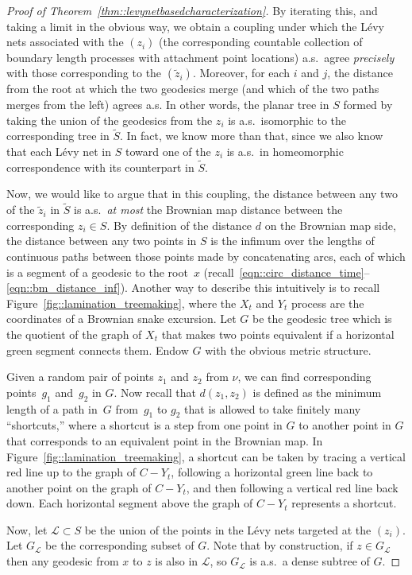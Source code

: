 \documentclass[JEP,XML,SOM,Unicode]{cedram}
\let\mathcal\mathscr
\theoremstyle{plain}
\numberwithin{theorem}{section}
\theoremstyle{definition}
\newcommand{\CL}{{\mathcal L}}
\let\wt\widetilde
\begin{document}
\begin{proof}[Proof of Theorem~\ref{thm::levynetbasedcharacterization}]
By iterating this, and taking a limit in the obvious way, we obtain a coupling under which the Lévy nets associated with the $(z_i)$ (\ie the corresponding countable collection of boundary length processes with attachment point locations) a.s.\ agree \emph{precisely} with those corresponding to the $(\wt{z}_i)$. Moreover, for each $i$ and $j$, the distance from the root at which the two geodesics merge (and which of the two paths merges from the left) agrees a.s. In other words, the planar tree in $S$ formed by taking the union of the geodesics from the $z_i$ is a.s.\ isomorphic to the corresponding tree in $\wt{S}$. In fact, we know more than that, since we also know that each Lévy net in $S$ toward one of the $z_i$ is a.s.\ in homeomorphic correspondence with its counterpart in $\wt{S}$.

Now, we would like to argue that in this coupling, the distance between any two of the $\wt{z}_i$ in $\wt{S}$ is a.s.\ \emph{at most} the Brownian map distance between the corresponding $z_i \in S$. By definition of the distance $d$ on the Brownian map side, the distance between any two points in $S$ is the infimum over the lengths of continuous paths between those points made by concatenating arcs, each of which is a segment of a geodesic to the root~$x$ (recall~\eqref{eqn::circ_distance_time}--\eqref{eqn::bm_distance_inf}). Another way to describe this intuitively is to recall Figure~\ref{fig::lamination_treemaking}, where the $X_t$ and $Y_t$ process are the coordinates of a Brownian snake excursion. Let $G$ be the geodesic tree which is the quotient of the graph of $X_t$ that makes two points equivalent if a horizontal green segment connects them. Endow $G$ with the obvious metric structure.

Given a random pair of points $z_1$ and $z_2$ from $\nu$, we can find corresponding points~$g_1$ and~$g_2$ in $G$. Now recall that $d(z_1, z_2)$ is defined as the minimum length of a path in~$G$ from~$g_1$ to $g_2$ that is allowed to take finitely many ``shortcuts,'' where a shortcut is a step from one point in $G$ to another point in $G$ that corresponds to an equivalent point in the Brownian map. In Figure~\ref{fig::lamination_treemaking}, a shortcut can be taken by tracing a vertical red line up to the graph of $C- Y_t$, following a horizontal green line back to another point on the graph of $C-Y_t$, and then following a vertical red line back down. Each horizontal segment above the graph of $C-Y_t$ represents a shortcut.

Now, let $\mathcal L \subset S$ be the union of the points in the Lévy nets targeted at the $(z_i)$. Let $G_\mathcal L$ be the corresponding subset of $G$. Note that by construction, if $z \in G_\CL$ then any geodesic from $x$ to $z$ is also in $\mathcal L$, so $G_\CL$ is a.s.\ a dense subtree of $G$.


\end{proof}
\end{document}
